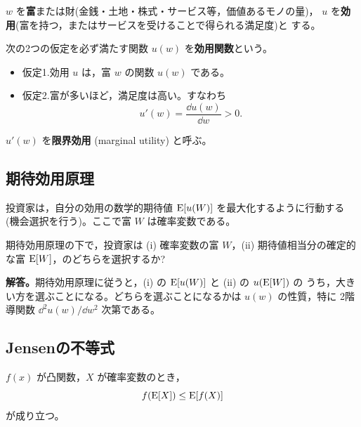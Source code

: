 $w$ を\textbf{富}または財(金銭・土地・株式・サービス等，価値あるモノの量)，
$u$ を\textbf{効用}(富を持つ，またはサービスを受けることで得られる満足度)と
する。

\begin{definition}[効用関数]
次の2つの仮定を必ず満たす関数 $u(w)$ を\textbf{効用関数}という。
\begin{itemize}
\item 仮定1.効用 $u$ は，富 $w$ の関数 $u(w)$ である。
\item 仮定2.富が多いほど，満足度は高い。すなわち
\begin{equation}
u'(w) = \frac{\dd u(w)}{\dd w} > 0.
\end{equation}
\end{itemize}
$u'(w)$ を\textbf{限界効用} (marginal utility) と呼ぶ。
\end{definition}

\vspace{18pt}

\subsection{期待効用原理}

\begin{definition}[期待効用原理]
投資家は，自分の効用の数学的期待値 $\mathrm{E}[u(W)]$ を最大化するように行動する
(機会選択を行う)。ここで富 $W$ は確率変数である。
\end{definition}

\begin{example}
期待効用原理の下で，投資家は (i) 確率変数の富 $W$，(ii) 期待値相当分の確定的な富
$\mathrm{E}[W]$，のどちらを選択するか?

\textbf{解答。}期待効用原理に従うと，(i) の $\mathrm{E}[u(W)]$ と (ii) の $u(\mathrm{E}[W])$ の
うち，大きい方を選ぶことになる。どちらを選ぶことになるかは $u(w)$ の性質，特に
2階導関数 $\dd^2 u(w)/\dd w^2$ 次第である。
\end{example}

\vspace{18pt}

\subsection{Jensenの不等式}

\begin{theorem}[Jensenの不等式]
$f(x)$ が凸関数，$X$ が確率変数のとき，
\begin{equation}
f(\mathrm{E}[X]) \leq \mathrm{E}[f(X)]
\end{equation}
が成り立つ。
\end{theorem}

